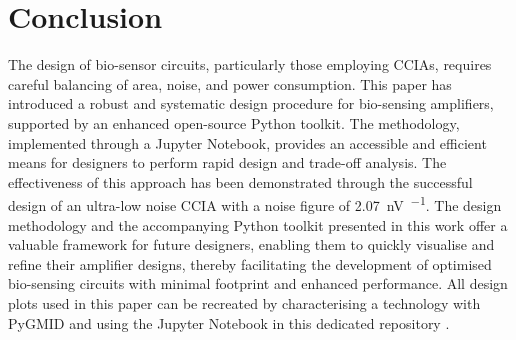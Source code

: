 \section{Conclusion}\label{sec:conclusion}
The design of bio-sensor circuits, particularly those employing CCIAs, requires careful balancing of area, noise, and power consumption. 
This paper has introduced a robust and systematic design procedure for bio-sensing amplifiers, supported by an enhanced open-source Python \gmID toolkit. The methodology, implemented through a Jupyter Notebook, provides an accessible and efficient means for designers to perform rapid design and trade-off analysis. The effectiveness of this approach has been demonstrated through the successful design of an ultra-low noise CCIA with a noise figure of \SI{2.07}{\nano\volt\per\sqrt{\hertz}}. The \gmID design methodology and the accompanying Python toolkit presented in this work offer a valuable framework for future designers, enabling them to quickly visualise and refine their amplifier designs, thereby facilitating the development of optimised bio-sensing circuits with minimal footprint and enhanced performance. All design plots used in this paper can be recreated by characterising a technology with PyGMID \cite{O_Donnell_PyGMID} and using the Jupyter Notebook in this dedicated repository \cite{CCIA_GMID}.






